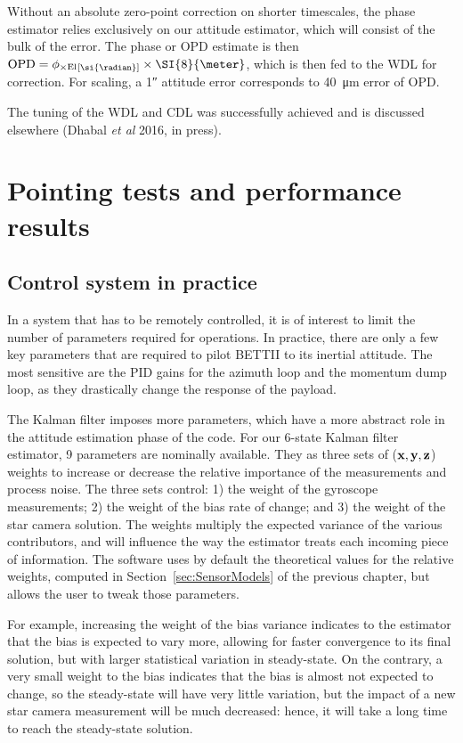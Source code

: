 Without an absolute zero-point correction on shorter timescales, the phase estimator relies exclusively on our attitude estimator, which will consist of the bulk of the error. The phase or OPD estimate is then $\OPD = \crossEl\units{\si{\radian}}\times \SI{8}{\meter} $, which is then fed to the WDL for correction. For scaling, a \ang{;;1} attitude error corresponds to \SI{40}{\um} error of OPD. 

The tuning of the WDL and CDL was successfully achieved and is discussed elsewhere (Dhabal \textit{et al} 2016, in press).



\section{Pointing tests and performance results}

\subsection{Control system in practice}

In a system that has to be remotely controlled, it is of interest to limit the number of parameters required for operations. In practice, there are only a few key parameters that are required to pilot BETTII to its inertial attitude. The most sensitive are the PID gains for the azimuth loop and the momentum dump loop, as they drastically change the response of the payload. 

The Kalman filter imposes more parameters, which have a more abstract role in the attitude estimation phase of the code. For our 6-state Kalman filter estimator, 9 parameters are nominally available. They as three sets of ($\textrm{\textbf{x}}, \textrm{\textbf{y}}, \textrm{\textbf{z}}$) weights to increase or decrease the relative importance of the measurements and process noise. The three sets control: 1) the weight of the gyroscope measurements; 2) the weight of the bias rate of change; and 3) the weight of the star camera solution. The weights multiply the expected variance of the various contributors, and will influence the way the estimator treats each incoming piece of information. The software uses by default the theoretical values for the relative weights, computed in Section~\ref{sec:SensorModels} of the previous chapter, but allows the user to tweak those parameters. 

For example, increasing the weight of the bias variance indicates to the estimator that the bias is expected to vary more, allowing for faster convergence to its final solution, but with larger statistical variation in steady-state. On the contrary, a very small weight to the bias indicates that the bias is almost not expected to change, so the steady-state will have very little variation, but the impact of a new star camera measurement will be much decreased: hence, it will take a long time to reach the steady-state solution.

